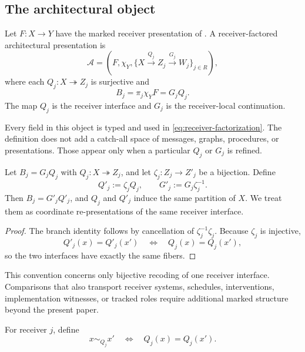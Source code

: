 \subsection{The architectural object}

\begin{definition}\label{def:receiver-factored-architecture}
Let $F:X\to Y$ have the marked receiver presentation of . A receiver-factored architectural presentation is
\[
\mathcal A
=
\left(
F,\chi_Y,
\{X\xrightarrow{Q_j}Z_j\xrightarrow{G_j}W_j\}_{j\in R}
\right),
\]
where each $Q_j:X\twoheadrightarrow Z_j$ is surjective and
\begin{equation}\label{eq:receiver-factorization}
\boxed{
B_j
=
\pi_j\chi_YF
=
G_jQ_j.
}
\end{equation}
The map $Q_j$ is the receiver interface and $G_j$ is the receiver-local continuation.
\end{definition}

Every field in this object is typed and used in \eqref{eq:receiver-factorization}. The definition does not add a catch-all space of messages, graphs, procedures, or presentations. Those appear only when a particular $Q_j$ or $G_j$ is refined.

\begin{proposition}\label{prop:interface-representation}
Let $B_j=G_jQ_j$ with $Q_j:X\twoheadrightarrow Z_j$, and let $\zeta_j:Z_j\to Z'_j$ be a bijection. Define
\[
Q'_j:=\zeta_jQ_j,
\qquad
G'_j:=G_j\zeta_j^{-1}.
\]
Then $B_j=G'_jQ'_j$, and $Q_j$ and $Q'_j$ induce the same partition of $X$. We treat them as coordinate re-presentations of the same receiver interface.
\end{proposition}

\begin{proof}
The branch identity follows by cancellation of $\zeta_j^{-1}\zeta_j$. Because $\zeta_j$ is injective,
\[
Q'_j(x)=Q'_j(x')
\quad\Longleftrightarrow\quad
Q_j(x)=Q_j(x'),
\]
so the two interfaces have exactly the same fibers.
\end{proof}

This convention concerns only bijective recoding of one receiver interface. Comparisons that also transport receiver systems, schedules, interventions, implementation witnesses, or tracked roles require additional marked structure beyond the present paper.

\begin{definition}\label{def:receiver-indistinguishability}
For receiver $j$, define
\[
x\sim_{Q_j}x'
\quad\Longleftrightarrow\quad
Q_j(x)=Q_j(x').
\]
\end{definition}

